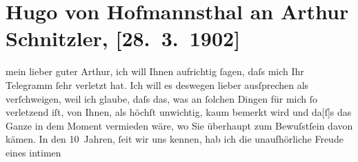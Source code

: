 

         
         \renewcommand{\erwaehntePersonen}{Personen: Hugo von Hofmannsthal, Rudolf Kassner, Paul von Thun-Hohenstein, Josef Oswald Thun-Hohenstein-Salm-Reifferscheid, Adolf Thun-Hohenstein-Salm-Reifferscheid, Oswald Thun-Hohenstein-Salm-Reifferscheid, Christiane von Thun-Hohenstein-Salm-Reifferscheidt}
         \renewcommand{\erwaehnteOrte}{Orte: Palais Thun-Salm, Prag, Riviera, Rodaun, Wien}
         \renewcommand{\erwaehnteWerke}{}
               \section[Hugo von Hofmannsthal an Arthur Schnitzler, {[}28. 3. 1902{]}]{ Hugo von Hofmannsthal an Arthur Schnitzler, {[}28. 3. 1902{]}}\nopagebreak{}\rehead{ }\begin{ledgroupsized}[t]{13cm}\normalsize\beginnumbering{} \toendnotes[C]{\smallbreak\pagebreak[2]} 
\toendnotes[C]{\smallbreak}\pstart{}{\pb}mein lieber guter
                  Arthur,\pend\pstart
           ich will Ihnen aufrichtig ſagen, daſs mich Ihr Telegramm ſehr verletzt hat. Ich will
               es deswegen lieber ausſprechen als verſchweigen, weil ich glaube, daſs das, was an
               ſolchen Dingen für mich ſo verletzend iſt, von Ihnen, als höchſt unwichtig, kaum {\pb}bemerkt wird und
                  da{[}ſ{]}s das Ganze in dem Moment vermieden wäre, wo Sie überhaupt
               zum Bewuſstſein davon kämen.\pend
           \pstart
           In den 10 Jahren, ſeit wir uns kennen, hab ich die unaufhörliche Freude eines intimen

\end{ledgroupsized}
